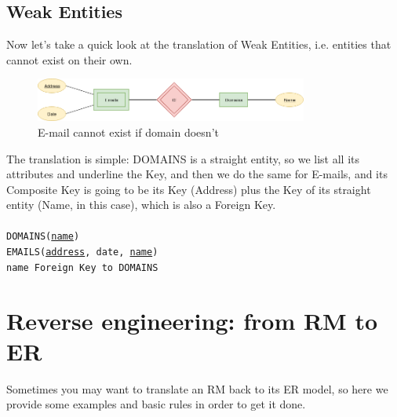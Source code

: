 \documentclass[class=book, crop=false, oneside]{standalone}
\newcommand\tab[1][1cm]{\hspace*{#1}}
\begin{document}
\section{Weak Entities}
Now let's take a quick look at the translation of Weak Entities, i.e. entities that cannot exist on their own.\\
\begin{figure}[H]
	\includegraphics[width=0.8\textwidth,keepaspectratio]{diagram4_00.png}
	\caption{E-mail cannot exist if domain doesn't}
	\label{diagram4_00}
\end{figure}
\vskip 5pt
The translation is simple: DOMAINS is a straight entity, so we list all its attributes and underline the Key, and then we do the same for E-mails, and its Composite Key is going to be its Key (Address) plus the Key of its straight entity (Name, in this case), which is also a Foreign Key.\\\\
\texttt{DOMAINS(\underline{name})}\\
\texttt{EMAILS(\underline{address}, date, \underline{name})}\\
\tab[.4cm] \texttt{name Foreign Key to DOMAINS}
\vskip 5pt

\chapter{Reverse engineering: from RM to ER}
Sometimes you may want to translate an RM back to its ER model, so here we provide some examples and basic rules in order to get it done.
\end{document}
